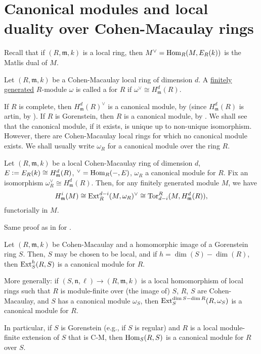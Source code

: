 \documentclass[12pt]{article}
\begin{document}
\section{Canonical modules and local duality over Cohen-Macaulay rings}

Recall that if $(R, \mathfrak{m}, k)$ is a local ring, then $M^{\vee} = \operatorname{Hom}_{R}(M, E_{R}(k))$ is the Matlis dual of $M$. 

\begin{defn}
	Let $(R, \mathfrak{m}, k)$ be a Cohen-Macaulay local ring of dimension $d$. \newline
	A \underline{finitely generated} $R$-module $\omega$ is called a  for $R$ if $\omega^{\vee} \cong H_{\mathfrak{m}}^{d}(R)$.
\end{defn}
If $R$ is complete, then $H_{\mathfrak{m}}^{d}(R)^{\vee}$ is a canonical module, by  (since $H_{\mathfrak{m}}^{d}(R)$ is artin, by ). If $R$ is Gorenstein, then $R$ is a canonical module, by . \newline
We shall see that the canonical module, if it exists, is unique up to non-unique isomorphism. However, there are Cohen-Macaulay local rings for which no canonical module exists. \newline
We shall usually write $\omega_{R}$ for a canonical module over the ring $R$.

\begin{thm} \label{thm:local-duality-cohen-macaulay}
	Let $(R, \mathfrak{m}, k)$ be a local Cohen-Macaulay ring of dimension $d$, $E \vcentcolon= E_{R}(k) \cong H_{\mathfrak{m}}^{d}(R)$, $^{\vee} = \operatorname{Hom}_{R}(-, E)$, $\omega_{R}$ a canonical module for $R$. Fix an isomorphism $\omega_{R}^{\vee} \cong H_{\mathfrak{m}}^{d}(R)$. \newline
	Then, for any finitely generated module $M$, we have
	\begin{equation*} 
		H_{\mathfrak{m}}^{i}(M) \cong \operatorname{Ext}_{R}^{d - i}(M, \omega_{R})^{\vee} \cong \operatorname{Tor}^{R}_{d - i}(M, H_{\mathfrak{m}}^{d}(R)),
	\end{equation*}
	functorially in $M$.
\end{thm}
Same proof as in for . 

\begin{thm}
	Let $(R, \mathfrak{m}, k)$ be Cohen-Macaulay and a homomorphic image of a Gorenstein ring $S$. Then, $S$ may be chosen to be local, and if $h = \dim(S) - \dim(R)$, then $\operatorname{Ext}_{S}^{h}(R, S)$ is a canonical module for $R$.

	More generally: if $(S, \mathfrak{n}, \ell) \to (R, \mathfrak{m}, k)$ is a local homomorphism of local rings such that $R$ is module-finite over (the image of) $S$, $R$, $S$ are Cohen-Macaulay, and $S$ has a canonical module $\omega_{S}$, then $\operatorname{Ext}_{S}^{\dim S - \dim R}(R, \omega_{S})$ is a canonical module for $R$.
\end{thm}
In particular, if $S$ is Gorenstein (e.g., if $S$ is regular) and $R$ is a local module-finite extension of $S$ that is C-M, then $\operatorname{Hom}_{S}(R, S)$ is a canonical module for $R$ over $S$.
\end{document}
